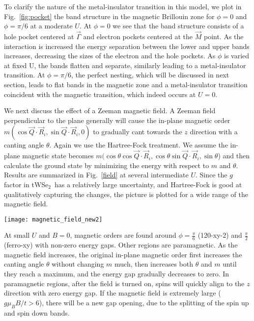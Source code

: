 \documentclass[%
reprint,
superscriptaddress,
twocolumn,
 amsmath,amssymb,
 aps,
 prb,
]{revtex4-2}
\newcommand{\twsetwo}{tWSe$_2$}
\begin{document}
To clarify the nature of the metal-insulator transition in this model, we plot in Fig.~\ref{fig:pocket} the band structure in the magnetic Brillouin zone for $\phi=0$ and $\phi=\pi/6$ at a moderate $U$. At $\phi=0$ we see that the band structure consists of a hole pocket centered at $\vec{\Gamma}$ and electron pockets centered at the $\vec M$ point. As the interaction is increased the energy separation between the lower and upper bands increases, decreasing the sizes of the electron and the hole pockets. As $\phi$ is varied at fixed U, the bands flatten and separate, similarly leading to a metal-insulator transition. At $\phi=\pi/6$, the perfect nesting, which will be discussed in next section, leads to flat bands in the magnetic zone and a metal-insulator transition coincident with the magnetic transition, which indeed occurs at $U=0$.

We next discuss the effect of a Zeeman magnetic field. A Zeeman field perpendicular to the plane generally will cause the in-plane magnetic order $m(\cos\vec{Q}\cdot \vec{R}_i, \sin\vec{Q}\cdot \vec{R}_i,0)$ to gradually cant towards the $z$ direction with a canting angle $\theta$. Again we use the Hartree-Fock treatment. We assume the in-plane magnetic state becomes $m(\cos\theta\cos\vec{Q}\cdot \vec{R}_i,\cos\theta\sin\vec{Q}\cdot \vec{R}_i,\sin\theta$) and then calculate the ground state by minimizing the energy with respect to $m$ and $\theta$. Results are summarized in Fig.~\ref{field} at several intermediate $U$. Since the $g$ factor in \twsetwo~has a relatively large uncertainty, and Hartree-Fock is good at qualitatively capturing the changes, the picture is plotted for a wide range of the magnetic field.
\begin{figure*}[ht]
  \centering 
  \texttt{[image: magnetic\_field\_new2]}
  \caption{(a) Phase diagram, (b) energy gap and (c) magnetization at half filling for $0\leq\phi\leq\pi/2$ for several U values. (a) In the phase diagram, gray represents the paramagnetism. The intensity of the blue and orange color indicates the canting angle $\theta$ of the magnetic order. Dark orange and dark blue represent the 120-xy-2 order and ferro-xy correspondingly, and the white regions have no xy moment. (b,c) In the energy gap and magnetic order plots, the colors represent the corresponding DM phase $\phi$. For $g\approx 10$ in tWSe2 with bandwidth around 100meV$\approx 10t$, $g\mu_BB/t=1$ corresponds to $B\approx 17$ T.}
  \label{field}
\end{figure*}

At small $U$ and $B=0$, magnetic orders are found around $\phi =\frac{\pi}{6}$ (120-xy-2) and $\frac{\pi}{2}$ (ferro-xy) with non-zero energy gaps. Other regions are paramagnetic. As the magnetic field increases, the original in-plane magnetic order first increases the canting angle $\theta$ without changing $m$ much, then increases both $\theta$ and $m$ until they reach a maximum, and the energy gap gradually decreases to zero. In paramagnetic regions, after the field is turned on, spins will quickly align to the $z$ direction with zero energy gap. If the magnetic field is extremely large ($g\mu_BB/t>6$), there will be a new gap opening, due to the splitting of the spin up and spin down bands.
\end{document}

